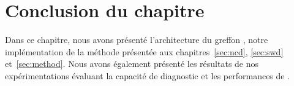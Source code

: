 \section*{Conclusion du chapitre}


Dans ce chapitre, nous avons présenté l'architecture du greffon \stady, notre
implémentation de la méthode présentée aux chapitres~\ref{sec:ncd},
\ref{sec:swd} et~\ref{sec:method}.
Nous avons également présenté les résultats de nos expérimentations évaluant
la capacité de diagnostic et les performances de \stady.

